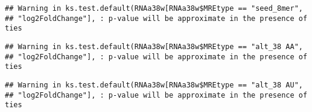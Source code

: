 \documentclass[
]{article}
\newenvironment{Shaded}{\begin{snugshade}}{\end{snugshade}}
\newcommand{\FunctionTok}[1]{\textcolor[rgb]{0.13,0.29,0.53}{\textbf{#1}}}
\newcommand{\NormalTok}[1]{#1}
\newcommand{\OtherTok}[1]{\textcolor[rgb]{0.56,0.35,0.01}{#1}}
\newcommand{\SpecialCharTok}[1]{\textcolor[rgb]{0.81,0.36,0.00}{\textbf{#1}}}
\newcommand{\StringTok}[1]{\textcolor[rgb]{0.31,0.60,0.02}{#1}}
\begin{document}
\begin{verbatim}
## Warning in ks.test.default(RNAa38w[RNAa38w$MREtype == "seed_8mer",
## "log2FoldChange"], : p-value will be approximate in the presence of ties
\end{verbatim}

\begin{Shaded}
\end{Shaded}

\begin{verbatim}
## Warning in ks.test.default(RNAa38w[RNAa38w$MREtype == "alt_38 AA",
## "log2FoldChange"], : p-value will be approximate in the presence of ties
\end{verbatim}

\begin{Shaded}
\end{Shaded}

\begin{verbatim}
## Warning in ks.test.default(RNAa38w[RNAa38w$MREtype == "alt_38 AU",
## "log2FoldChange"], : p-value will be approximate in the presence of ties
\end{verbatim}

\begin{Shaded}
\end{Shaded}
\end{document}
